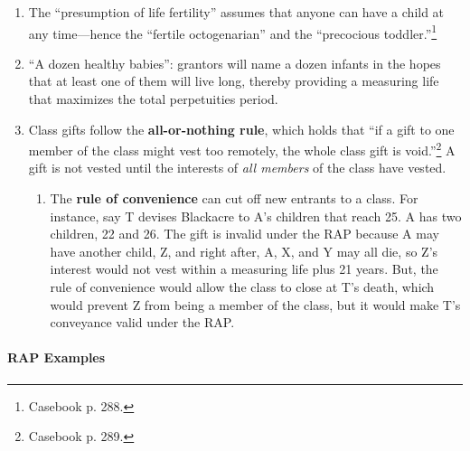 \begin{enumerate}
\begin{enumerate}
        plus 21 years. Since you can prove that the interest must vest within 
        this period, the remainder is valid.\footnote{Casebook pp. 286--87.}
        \item Invalid: O transfers land ``in trust to A for life, then to A's 
        first child to reach 25.'' The interest will not necessarily vest 
        before after A's life plus 21 years. Thus, the remainder is invalid.
        \item Invalid: to A and his heirs so long as used for school purposes, 
        and then to B and his heirs. The interest will not necessarily vest or 
        terminate within A or B's lifetimes.
    \end{enumerate}
    \item The ``presumption of life fertility'' assumes that anyone can have a 
    child at any time---hence the ``fertile octogenarian'' and the 
    ``precocious toddler.''\footnote{Casebook p. 288.}
    \item ``A dozen healthy babies'': grantors will name a dozen infants in 
    the hopes that at least one of them will live long, thereby providing a 
    measuring life that maximizes the total perpetuities period.
    \item Class gifts follow the \textbf{all-or-nothing rule}, which holds 
    that ``if a gift to one member of the class might vest too remotely, the 
    whole class gift is void.''\footnote{Casebook p. 289.} A gift is not 
    vested until the interests of \emph{all members} of the class have 
    vested.
    \begin{enumerate}
        \item The \textbf{rule of convenience} can cut off new entrants to a 
        class. For instance, say T devises Blackacre to A's children that 
        reach 25. A has two children, 22 and 26. The gift is invalid under the 
        RAP because A may have another child, Z, and right after, A, X, and Y may 
        all die, so Z's interest would not vest within a measuring life plus 
        21 years. But, the rule of convenience would allow the class to close 
        at T's death, which would prevent Z from being a member of the class, 
        but it would make T's conveyance valid under the RAP.
    \end{enumerate}
\end{enumerate}

\paragraph{RAP Examples}

